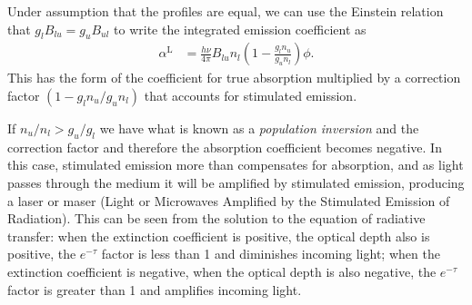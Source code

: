 
Under assumption that the profiles are equal, we can use the Einstein relation that $g_l B_{lu} = g_u
B_{ul}$ to write the integrated emission coefficient as
\begin{align}
\alpha^\mathrm{L} &= \frac{h\nu}{4\pi} B_{lu} n_l \left(1 - 
\frac{g_l n_u}{g_u n_l}\right) \phi.
\end{align}
This has the form of the coefficient for true absorption
multiplied by a correction factor $(1 - 
g_l n_u/g_u n_l)$ that accounts for
stimulated emission. 

If $n_u/n_l > g_u/g_l$ we have what is known as a 
\emph{population inversion} and the correction factor and therefore the absorption coefficient
becomes negative. In this case, stimulated emission more
than compensates for absorption, and as light passes through
the medium it will be amplified by stimulated emission,
producing a laser or maser (Light or Microwaves Amplified by
the Stimulated Emission of Radiation). This can be seen from
the solution to the equation of radiative transfer: when the
extinction coefficient is positive, the optical depth also
is positive, the $e^{-\tau}$ factor is less than 1 and
diminishes incoming light; when the extinction coefficient
is negative, when the optical depth is also negative, the
$e^{-\tau}$ factor is greater than 1 and amplifies incoming
light.


